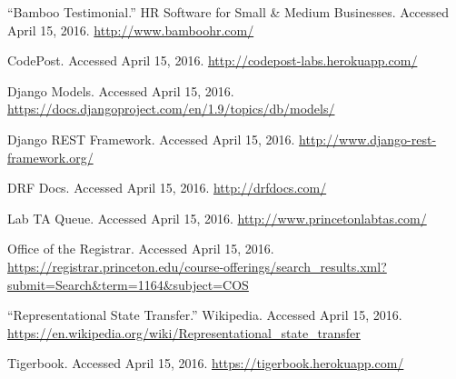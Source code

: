 \newpage
{}

\begingroup
\renewcommand{\section}[2]{}

\begin{singlespace}
\begin{flushleft}

\begin{footnotesize}

\begin{thebibliography}{\kern\bibindent}

    ``Bamboo Testimonial.'' HR Software for Small \& Medium Businesses. Accessed April 15, 2016. \url{http://www.bamboohr.com/}

    CodePost. Accessed April 15, 2016. \url{http://codepost-labs.herokuapp.com/}

    Django Models. Accessed April 15, 2016. \url{https://docs.djangoproject.com/en/1.9/topics/db/models/}

    Django REST Framework. Accessed April 15, 2016. \url{http://www.django-rest-framework.org/}

    DRF Docs. Accessed April 15, 2016. \url{http://drfdocs.com/}

    Lab TA Queue. Accessed April 15, 2016. \url{http://www.princetonlabtas.com/}

    Office of the Registrar. Accessed April 15, 2016. \url{https://registrar.princeton.edu/course-offerings/search\_results.xml?submit=Search\&term=1164\&subject=COS}

    ``Representational State Transfer.'' Wikipedia. Accessed April 15, 2016. \url{https://en.wikipedia.org/wiki/Representational\_state\_transfer}

    Tigerbook. Accessed April 15, 2016. \url{https://tigerbook.herokuapp.com/}

\end{thebibliography}
\end{footnotesize}
\end{flushleft}
\end{singlespace}
\endgroup

